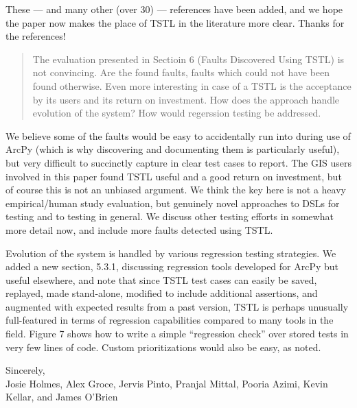 \documentclass{article}[12pt]
\begin{document}
These --- and many other (over 30) --- references have been added, and we hope the paper now makes the place of TSTL in the literature more clear.  Thanks for the references!

\begin{quote}
The evaluation presented in Sectioin 6 (Faults Discovered Using TSTL) is not 
convincing. Are the found faults, faults which could not have been found otherwise. 
Even more interesting in case of a TSTL is the acceptance by its users and its 
return on investment. How does the approach handle evolution of the system? How 
would regerssion testing be addressed.
\end{quote}

We believe some of the faults would be easy to accidentally run into during use of ArcPy (which is why discovering and documenting them is particularly useful), but very difficult to succinctly capture in clear test cases to report.  The GIS users involved in this paper found TSTL useful and a good return on investment, but of course this is not an unbiased argument.  We think the key here is not a heavy empirical/human study evaluation, but genuinely novel approaches to DSLs for testing and to testing in general. We discuss other testing efforts in somewhat more detail now, and include more faults detected using TSTL.

Evolution of the system is handled by various regression testing strategies.  We added a new section, 5.3.1, discussing regression tools developed for ArcPy but useful elsewhere, and note that since TSTL test cases can easily be saved, replayed, made stand-alone, modified to include additional assertions, and augmented with expected results from a past version, TSTL is perhaps unusually full-featured in terms of regression capabilities compared to many tools in the field.  Figure 7 shows how to write a simple ``regression check'' over stored tests in very few lines of code. Custom prioritizations would also be easy, as noted.

\vspace{0.5in}

\noindent Sincerely,\\
Josie Holmes, Alex Groce, Jervis Pinto, Pranjal Mittal, Pooria Azimi, Kevin Kellar, and James O'Brien
\end{document}
